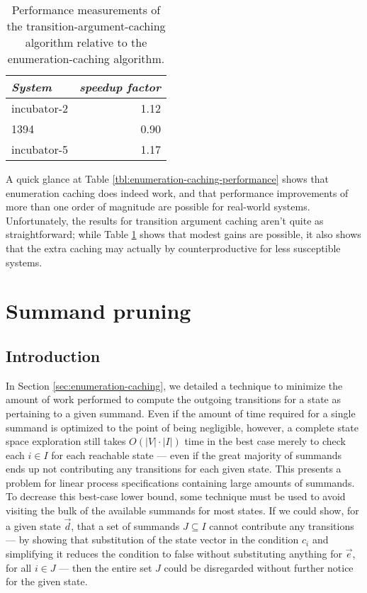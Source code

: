\documentclass[a4paper]{article}
\begin{document}
\begin{table}[h]
\begin{center}
\begin{tabular}{l|r}
\emph{System} & \emph{speedup factor} \\
\hline
incubator-2 & 1.12 \\
1394 & 0.90 \\
incubator-5 & 1.17 \\
\end{tabular}
\caption{Performance measurements of the transition-argument-caching algorithm relative to the enumeration-caching algorithm.}
\label{tbl:transition-argument-caching-performance}
\end{center}
\end{table}

A quick glance at Table \ref{tbl:enumeration-caching-performance} shows that enumeration caching does indeed work, and that performance improvements of more than one order of magnitude are possible for real-world systems. Unfortunately, the results for transition argument caching aren't quite as straightforward; while Table \ref{tbl:transition-argument-caching-performance} shows that modest gains are possible, it also shows that the extra caching may actually by counterproductive for less susceptible systems.


\section{Summand pruning}
\label{sec:summand-pruning}

\subsection{Introduction}
\label{sec:summand-pruning/introduction}
In Section \ref{sec:enumeration-caching}, we detailed a technique to minimize the amount of work performed to compute the outgoing transitions for a state as pertaining to a given summand. Even if the amount of time required for a single summand is optimized to the point of being negligible, however, a complete state space exploration still takes $O(|V| \cdot |I|)$ time in the best case merely to check each $i \in I$ for each reachable state --- even if the great majority of summands ends up not contributing any transitions for each given state. This presents a problem for linear process specifications containing large amounts of summands. To decrease this best-case lower bound, some technique must be used to avoid visiting the bulk of the available summands for most states. If we could show, for a given state $\vec{d}$, that a set of summands $J \subseteq I$ cannot contribute any transitions --- by showing that substitution of the state vector in the condition $c_i$ and simplifying it reduces the condition to \textsf{false} without substituting anything for $\vec{e}$, for all $i \in J$ --- then the entire set $J$ could be disregarded without further notice for the given state.
\end{document}
